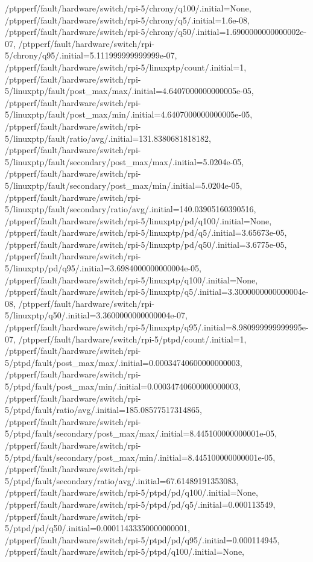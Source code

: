 {    /ptpperf/fault/hardware/switch/rpi-5/chrony/q100/.initial=None,
    /ptpperf/fault/hardware/switch/rpi-5/chrony/q5/.initial=1.6e-08,
    /ptpperf/fault/hardware/switch/rpi-5/chrony/q50/.initial=1.6900000000000002e-07,
    /ptpperf/fault/hardware/switch/rpi-5/chrony/q95/.initial=5.111999999999999e-07,
    /ptpperf/fault/hardware/switch/rpi-5/linuxptp/count/.initial=1,
    /ptpperf/fault/hardware/switch/rpi-5/linuxptp/fault/post_max/max/.initial=4.6407000000000005e-05,
    /ptpperf/fault/hardware/switch/rpi-5/linuxptp/fault/post_max/min/.initial=4.6407000000000005e-05,
    /ptpperf/fault/hardware/switch/rpi-5/linuxptp/fault/ratio/avg/.initial=131.8380681818182,
    /ptpperf/fault/hardware/switch/rpi-5/linuxptp/fault/secondary/post_max/max/.initial=5.0204e-05,
    /ptpperf/fault/hardware/switch/rpi-5/linuxptp/fault/secondary/post_max/min/.initial=5.0204e-05,
    /ptpperf/fault/hardware/switch/rpi-5/linuxptp/fault/secondary/ratio/avg/.initial=140.03905160390516,
    /ptpperf/fault/hardware/switch/rpi-5/linuxptp/pd/q100/.initial=None,
    /ptpperf/fault/hardware/switch/rpi-5/linuxptp/pd/q5/.initial=3.65673e-05,
    /ptpperf/fault/hardware/switch/rpi-5/linuxptp/pd/q50/.initial=3.6775e-05,
    /ptpperf/fault/hardware/switch/rpi-5/linuxptp/pd/q95/.initial=3.6984000000000004e-05,
    /ptpperf/fault/hardware/switch/rpi-5/linuxptp/q100/.initial=None,
    /ptpperf/fault/hardware/switch/rpi-5/linuxptp/q5/.initial=3.3000000000000004e-08,
    /ptpperf/fault/hardware/switch/rpi-5/linuxptp/q50/.initial=3.3600000000000004e-07,
    /ptpperf/fault/hardware/switch/rpi-5/linuxptp/q95/.initial=8.980999999999995e-07,
    /ptpperf/fault/hardware/switch/rpi-5/ptpd/count/.initial=1,
    /ptpperf/fault/hardware/switch/rpi-5/ptpd/fault/post_max/max/.initial=0.00034740600000000003,
    /ptpperf/fault/hardware/switch/rpi-5/ptpd/fault/post_max/min/.initial=0.00034740600000000003,
    /ptpperf/fault/hardware/switch/rpi-5/ptpd/fault/ratio/avg/.initial=185.08577517314865,
    /ptpperf/fault/hardware/switch/rpi-5/ptpd/fault/secondary/post_max/max/.initial=8.445100000000001e-05,
    /ptpperf/fault/hardware/switch/rpi-5/ptpd/fault/secondary/post_max/min/.initial=8.445100000000001e-05,
    /ptpperf/fault/hardware/switch/rpi-5/ptpd/fault/secondary/ratio/avg/.initial=67.61489191353083,
    /ptpperf/fault/hardware/switch/rpi-5/ptpd/pd/q100/.initial=None,
    /ptpperf/fault/hardware/switch/rpi-5/ptpd/pd/q5/.initial=0.000113549,
    /ptpperf/fault/hardware/switch/rpi-5/ptpd/pd/q50/.initial=0.00011433350000000001,
    /ptpperf/fault/hardware/switch/rpi-5/ptpd/pd/q95/.initial=0.000114945,
    /ptpperf/fault/hardware/switch/rpi-5/ptpd/q100/.initial=None,
}
